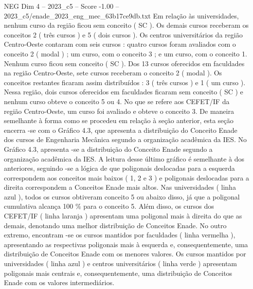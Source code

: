 \begin{textsample}{NEG Dim 4 – 2023\_c5 – Score -1.00 – 2023\_c5/enade\_2023\_eng\_mec\_63b17ce9db.txt}
Em relação às universidades, nenhum curso da região ficou sem conceito ( SC ).
Os demais cursos receberam os conceitos 2 ( três cursos ) e 5 ( dois cursos ).
Os centros universitários da região Centro-Oeste contaram com seis cursos : quatro cursos foram avaliados com o conceito 2 ( modal ) ; um curso, com o conceito 3 ; e um curso, com o conceito 1.
Nenhum curso ficou sem conceito ( SC ).
Dos 13 cursos oferecidos em faculdades na região Centro-Oeste, sete cursos receberam o conceito 2 ( modal ).
Os conceitos restantes ficaram assim distribuídos : 3 ( três cursos ) e 1 ( um curso ).
Nessa região, dois cursos oferecidos em faculdades ficaram sem conceito ( SC ) e nenhum curso obteve o conceito 5 ou 4.
No que se refere aos CEFET/IF da região Centro-Oeste, um curso foi avaliado e obteve o conceito 3.
De maneira semelhante à forma como se procedeu em relação à seção anterior, esta seção encerra -se com o Gráfico 4.3, que apresenta a distribuição do Conceito Enade dos cursos de Engenharia Mecânica segundo a organização acadêmica da IES.
No Gráfico 4.3, apresenta -se a distribuição do Conceito Enade segundo a organização acadêmica da IES.
A leitura desse último gráfico é semelhante à dos anteriores, seguindo -se a lógica de que poligonais deslocadas para a esquerda correspondem aos conceitos mais baixos ( 1, 2 e 3 ) e poligonais deslocadas para a direita correspondem a Conceitos Enade mais altos.
Nas universidades ( linha azul ), todos os cursos obtiveram conceito 5 ou abaixo disso, já que a poligonal cumulativa alcança 100 \% para o conceito 5.
Além disso, os cursos dos CEFET/IF ( linha laranja ) apresentam uma poligonal mais à direita do que as demais, denotando uma melhor distribuição de Conceitos Enade.
No outro extremo, encontram -se os cursos mantidos por faculdades ( linha vermelha ), apresentando as respectivas poligonais mais à esquerda e, consequentemente, uma distribuição de Conceitos Enade com os menores valores.
Os cursos mantidos por universidades ( linha azul ) e centros universitários ( linha verde ) apresentam poligonais mais centrais e, consequentemente, uma distribuição de Conceitos Enade com os valores intermediários.

\end{textsample}
